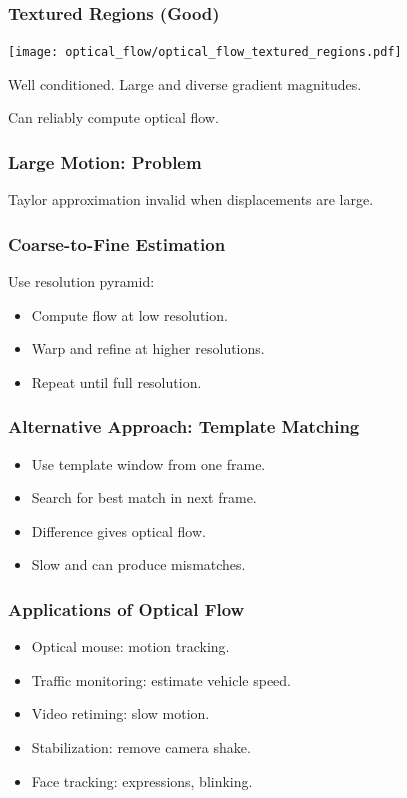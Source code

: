 \begin{frame}
    \frametitle{Textured Regions (Good)}
    \begin{center}
      \texttt{[image: optical\_flow/optical\_flow\_textured\_regions.pdf]}
    \end{center}

    Well conditioned. Large and diverse gradient magnitudes.
    
    Can reliably compute optical flow.
\end{frame}

\begin{frame}
  \frametitle{Large Motion: Problem}
Taylor approximation invalid when displacements are large.

\vspace{0.5cm}
\centering
\end{frame}

\begin{frame}
  \frametitle{Coarse-to-Fine Estimation}
Use resolution pyramid:
\begin{itemize}
  \item Compute flow at low resolution.
  \item Warp and refine at higher resolutions.
  \item Repeat until full resolution.
\end{itemize}

\vspace{0.5cm}
\centering
\end{frame}

\begin{frame}
  \frametitle{Alternative Approach: Template Matching}
\begin{itemize}
  \item Use template window from one frame.
  \item Search for best match in next frame.
  \item Difference gives optical flow.
  \item Slow and can produce mismatches.
\end{itemize}

\vspace{0.5cm}
\centering
\end{frame}

\begin{frame}
  \frametitle{Applications of Optical Flow}
\begin{itemize}
  \item Optical mouse: motion tracking.
  \item Traffic monitoring: estimate vehicle speed.
  \item Video retiming: slow motion.
  \item Stabilization: remove camera shake.
  \item Face tracking: expressions, blinking.
\end{itemize}

\vspace{0.5cm}
\centering
\end{frame}

